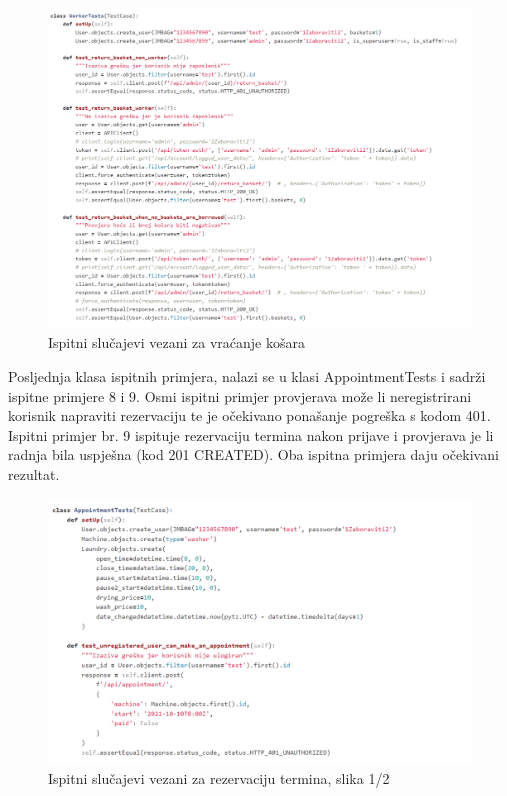 			\begin{figure}[H]
				\centering
				\includegraphics[scale=0.65]{slike/WorkerTests.PNG}
				\caption{Ispitni slučajevi vezani za vraćanje košara}
				\label{fig:promjene}
			\end{figure}
		
			Posljednja klasa ispitnih primjera, nalazi se u klasi AppointmentTests i sadrži ispitne primjere 8 i 9. Osmi ispitni primjer provjerava može li neregistrirani korisnik napraviti rezervaciju te je očekivano ponašanje pogreška s kodom 401. Ispitni primjer br. 9 ispituje rezervaciju termina nakon prijave i provjerava je li radnja bila uspješna (kod 201 CREATED). Oba ispitna primjera daju očekivani rezultat.
			
			\begin{figure}[H]
				\centering
				\includegraphics[scale=0.65]{slike/AppointmentTests1.PNG}
				\caption{Ispitni slučajevi vezani za rezervaciju termina, slika 1/2}
				\label{fig:promjene}
			\end{figure}
		
